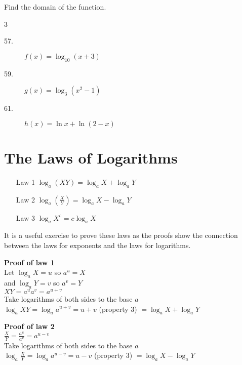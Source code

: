 Find the domain of the function. 

\columnsep =30pt
\begin {multicols}{3}
\begin{description}
\item [57.] $f (x) =\log _{10} \left (x +3\right )$ 

\item [59.] $g (x) =\log _{3} \left (x^{2} -1\right )$ 

\item [61.] $h (x) =\ln  x +\ln  \left (2 -x\right )$ 
\end{description}\end {multicols}


\section{The Laws of Logarithms}
\begin{enumerate}
\item [Law 1] $\log _{a} \left (X Y\right ) =\log _{a} X +\log _{a} Y$ 

\item [Law 2] $\log _{a} \genfrac{(}{)}{}{}{X}{Y} =\log _{a} X -\log _{a} Y$ 

\item [Law 3] $\log _{a} X^{c} =c \log _{a} X$ 
\end{enumerate}


It is a useful exercise to prove these laws as the proofs show the
connection between the laws for exponents and the laws for logarithms. 

\textbf{Proof of law 1} \\\relax Let
$\log _{a} X =u$ so $a^{u} =X$ \\\relax and $\log _{a} Y =v$ so $a^{v} =Y$ \\\relax $X Y =a^{u} a^{v} =a^{u +v}$ \\\relax Take logarithms of both sides to the base $a$ \\\relax $\log _{a} X Y =\log _{a} a^{u +v} =u +v$ {\scriptsize (property 3)} $ =\log _{a} X +\log _{a} Y$ 

\textbf{Proof of law 2} \\\relax $\frac{X}{Y} =\frac{a^{u}}{a^{v}} =a^{u -v}$ \\\relax Take logarithms of both sides to the base $a$ \\\relax $\log _{a} \frac{X}{Y} =\log _{a} a^{u -v} =u -v$ {\scriptsize (property 3)} $ =\log _{a} X -\log _{a} Y$ 

